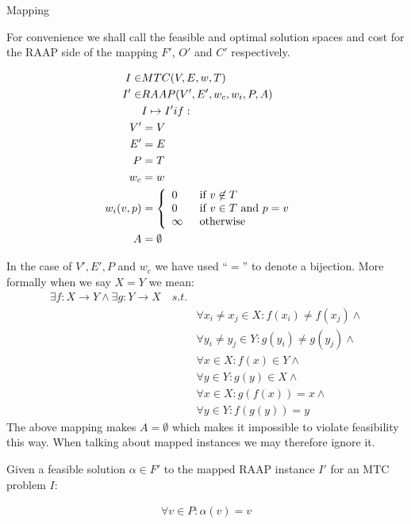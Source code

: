 \documentclass{article}
\begin{document}
\begin{definition}
Mapping

For convenience we shall call the feasible and optimal solution spaces and cost for the RAAP side of the mapping $F'$, $O'$ and $C'$ respectively.

\begin{align}
	\nonumber I \in & MTC(V,E,w,T) &\\
	\nonumber I' \in & RAAP(V', E', w_c, w_i, P, A) &\\
	\nonumber & I \mapsto I' if: &\\
	\nonumber V' & = V\\
	\nonumber E' & = E\\
	\nonumber P & = T\\
	\nonumber w_c & = w\\
	\nonumber w_i(v,p) & = \mbox{$\left\{ 
		\begin{array}{l l}
			0 \quad & \mbox{if $v \not\in T$}\\
			0 & \mbox{if $v \in T$ and $p = v$}\\
			\infty & \mbox{otherwise}\\ \end{array} \right.$} \\
	\nonumber A & = \emptyset
\end{align}

In the case of $V', E', P$ and $w_c$ we have used ``$=$'' to denote a bijection.
More formally when we say $X = Y$ we mean:
\begin{align}
	\nonumber \exists f : X \rightarrow Y \wedge \exists g : Y \rightarrow X \quad s.t. & \\
	\nonumber & \forall x_i \neq x_j \in X : f(x_i) \neq f(x_j) \wedge \\
	\nonumber & \forall y_i \neq y_j \in Y : g(y_i) \neq g(y_j) \wedge \\
	\nonumber & \forall x \in X : f(x) \in Y \wedge \\
	\nonumber & \forall y \in Y : g(y) \in X  \wedge \\
	\nonumber & \forall x \in X : g(f(x)) = x \wedge \\
	\nonumber & \forall y \in Y : f(g(y)) = y
\end{align}
The above mapping makes $A = \emptyset$ which makes it impossible to violate feasibility this way.
When talking about mapped instances we may therefore ignore it.
\end{definition}

\begin{lemma}
\label{FORCEASSIGN}
Given a feasible solution $\alpha \in F'$ to the mapped RAAP instance $I'$ for an MTC problem $I$:

\begin{align}
	\nonumber \forall v \in P : \alpha(v) = v
\end{align}
\end{lemma}
\end{document}
